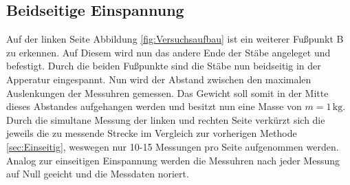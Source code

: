 \subsection{Beidseitige Einspannung}

Auf der linken Seite Abbildung \ref{fig:Versuchsaufbau} ist ein weiterer Fußpunkt B zu erkennen. Auf Diesem wird nun das
andere Ende der Stäbe angeleget und befestigt. Durch die beiden Fußpunkte sind die Stäbe nun beidseitig in der Apperatur
eingespannt. Nun wird der Abstand zwischen den maximalen Auslenkungen der Messuhren gemessen. Das Gewicht soll somit in der
Mitte dieses Abstandes aufgehangen werden und besitzt nun eine Masse von $m = 1\,\unit{\kilo\gram}$. Durch die simultane Messung der linken und rechten Seite verkürzt sich die jeweils
die zu messende Strecke im Vergleich zur vorherigen Methode \ref{sec:Einseitig}, weswegen nur 10-15 Messungen pro Seite 
aufgenommen werden. Analog zur einseitigen Einspannung werden die Messuhren nach jeder Messung auf Null geeicht und die Messdaten noriert.

%

